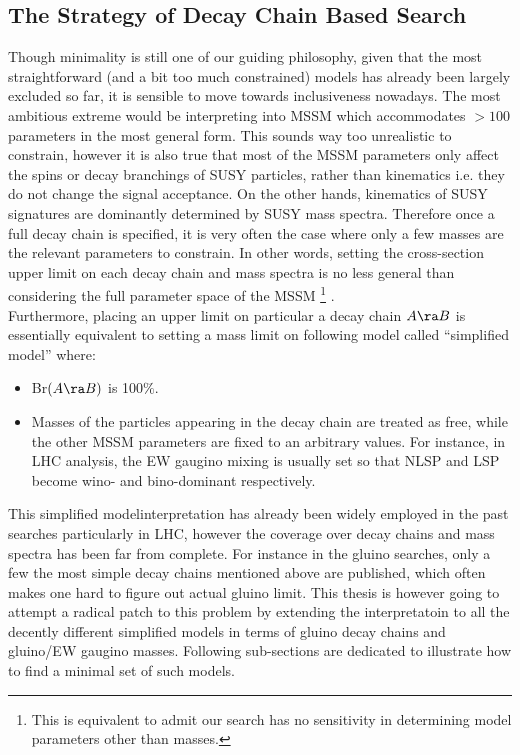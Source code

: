 \subsection{The Strategy of Decay Chain Based Search} \label{sec::Introduction::strategy}
Though minimality is still one of our guiding philosophy, 
given that the most straightforward (and a bit too much constrained) models has already been largely excluded so far,
it is sensible to move towards inclusiveness nowadays.
The most ambitious extreme would be interpreting into MSSM which accommodates $>100$ parameters in the most general form.
This sounds way too unrealistic to constrain, however it is also true that most of the MSSM parameters only affect the spins or decay branchings of SUSY particles, rather than kinematics i.e. they do not change the signal acceptance. On the other hands, kinematics of SUSY signatures are dominantly determined by SUSY mass spectra. Therefore once a full decay chain is specified, it is very often the case where only a few masses are the relevant parameters to constrain. In other words, setting the cross-section upper limit on each decay chain and mass spectra is no less general than considering the full parameter space of the MSSM
\footnote{This is equivalent to admit our search has no sensitivity in determining model parameters other than masses. }
.\\

Furthermore, placing an upper limit on particular a decay chain $A\ra B$ is essentially equivalent to setting a mass limit on following model called ``simplified model'' where:
\begin{itemize}
\item Br$(A \ra B)$ is 100$\%$.
\item Masses of the particles appearing in the decay chain are treated as free, while the other MSSM parameters are fixed to an arbitrary values. For instance, in LHC analysis, the EW gaugino mixing is usually set so that NLSP and LSP become wino- and bino-dominant respectively. 
\end{itemize}
This simplified modelinterpretation has already been widely employed in the past searches particularly in LHC, however the coverage over decay chains and mass spectra has been far from complete. For instance in the gluino searches, only a few the most simple decay chains mentioned above are published, which often makes one hard to figure out actual gluino limit. This thesis is however going to attempt a radical patch to this problem by extending the interpretatoin to all the decently different simplified models in terms of gluino decay chains and gluino/EW gaugino masses. Following sub-sections are dedicated to illustrate how to find a minimal set of such models. \\

